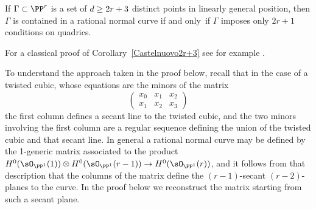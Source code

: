 \begin{corollary}
\label{Castelnuovo2r+3}
If $\Gamma\subset \PP^r$ is a set of $d \geq 2r+\nobreak 3$ distinct points in
%
%
linearly general position, then
$\Gamma$ is contained in a rational normal curve if and only~if $\Gamma$
imposes only $2r+1$
conditions on quadrics.
\end{corollary}
For a classical proof of Corollary~\ref{Castelnuovo2r+3} see for example
\cite[p.~531]{Griffiths-Harris1978}.

To understand the approach taken in the proof below, recall that in
the case of a twisted
cubic, whose equations are the minors of the matrix
$$
\begin{pmatrix}
x_0&x_1&x_2\\
x_1&x_2&x_3
\end{pmatrix}
$$
the first column defines a secant line to the twisted cubic, and the
two minors involving the first column are a regular sequence defining
the union of the twisted cubic and that secant line.
In general a rational normal curve may be defined by the 1-generic
matrix  associated to the product $H^0(\sO_{\PP^1}(1)) \otimes
H^0(\sO_{\PP^1}(r-1)) \to H^0(\sO_{\PP^1}(r))$,
and it follows from that description that the columns of the matrix
define the $(r-1)$-secant $(r-2)$-planes to the curve. In the proof
below we reconstruct the matrix starting from such a secant plane.

